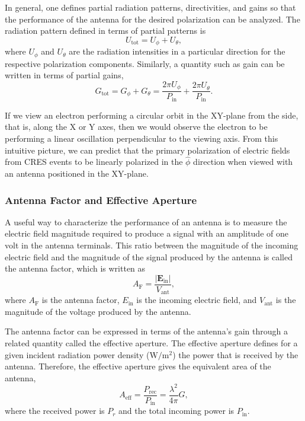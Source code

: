 In general, one defines partial radiation patterns, directivities, and gains so that the performance of the antenna for the desired polarization can be analyzed. The radiation pattern defined in terms of partial patterns is
\begin{equation}
    U_\mathrm{tot}=U_\phi + U_\theta,
\end{equation}
where $U_\phi$ and $U_\theta$ are the radiation intensities in a particular direction for the respective polarization components. Similarly, a quantity such as gain can be written in terms of partial gains,
\begin{equation}
    G_\mathrm{tot}=G_\phi+G_\theta=\frac{2\pi U_\phi}{P_\mathrm{in}}+\frac{2\pi U_\theta}{P_\mathrm{in}}.
\end{equation}

If we view an electron performing a circular orbit in the XY-plane from the side, that is, along the X or Y axes, then we would observe the electron to be performing a linear oscillation perpendicular to the viewing axis. From this intuitive picture, we can predict that the primary polarization of electric fields from CRES events to be linearly polarized in the $\hat\phi$ direction when viewed with an antenna positioned in the XY-plane.

\subsubsection{Antenna Factor and Effective Aperture}
\label{sec:ant-factor}
A useful way to characterize the performance of an antenna is to measure the electric field magnitude required to produce a signal with an amplitude of one volt in the antenna terminals. This ratio between the magnitude of the incoming electric field and the magnitude of the signal produced by the antenna is called the antenna factor, which is written as
\begin{equation}
    A_\mathrm{F} = \frac{|\mathbf{E}_\mathrm{in}|}{V_\mathrm{ant}},
    \label{eq:antenna-factor}
\end{equation}
where $A_\mathrm{F}$ is the antenna factor, $E_\mathrm{in}$ is the incoming electric field, and $V_\mathrm{ant}$ is the magnitude of the voltage produced by the antenna.

The antenna factor can be expressed in terms of the antenna's gain through a related quantity called the effective aperture. The effective aperture defines for a given incident radiation power density ($\mathrm{W}/\mathrm{m}^2$) the power that is received by the antenna. Therefore, the effective aperture gives the equivalent area of the antenna,
\begin{equation}
    A_\mathrm{eff}=\frac{P_\mathrm{rec}}{P_\mathrm{in}}=\frac{\lambda^2}{4\pi}G,
\end{equation}
where the received power is $P_r$ and the total incoming power is $P_\mathrm{in}$.

